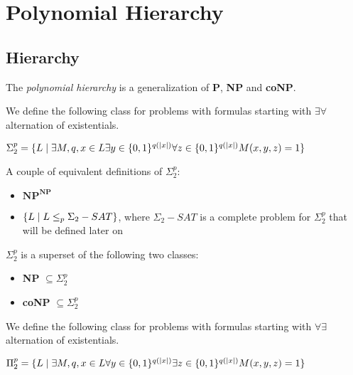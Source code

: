 \section{Polynomial Hierarchy}\label{sec:poly_hierarchy}

\subsection{Hierarchy}\label{subsec:poly_hierarchy}
    The \textit{polynomial hierarchy} is a generalization of \textbf{P}, \textbf{NP} and \textbf{coNP}.

    \begin{definition}[$\Sigma_2^p$]\label{def:sigma_2_p}
        We define the following class for problems with formulas starting with $\exists \forall$ alternation of existentials.

        $ \Sigma_2^p = \{ L \; \vert \; \exists M,q, x \in L \exists y \in \{ 0,1 \}^{q(\vert x \vert)} \forall z \in \{ 0,1 \}^{q(\vert x \vert)} M(x,y,z)=1 \} $
    \end{definition}

    A couple of equivalent definitions of $\Sigma_2^p$:
    \begin{itemize}
        \item $\bm{NP}^{\bm{NP}}$
        \item $ \{ L \; \vert \; L \leq_p \Sigma_2-SAT \} $, where $\Sigma_2-SAT$ is a complete problem for $\Sigma_2^p$ that will be defined later on
    \end{itemize}

    \begin{observation}
        $\Sigma_2^p$ is a superset of the following two classes:
        \begin{itemize}
            \item \textbf{NP} $\subseteq \Sigma_2^p$
            \item \textbf{coNP} $\subseteq \Sigma_2^p$
        \end{itemize}
    \end{observation}

    \begin{definition}[$\Pi_2^p$]\label{def:pi_2_p}
        We define the following class for problems with formulas starting with $\forall \exists$ alternation of existentials.

        $ \Pi_2^p = \{ L \; \vert \; \exists M,q, x \in L \forall y \in \{ 0,1 \}^{q(\vert x \vert)} \exists z \in \{ 0,1 \}^{q(\vert x \vert)} M(x,y,z)=1 \} $
    \end{definition}

